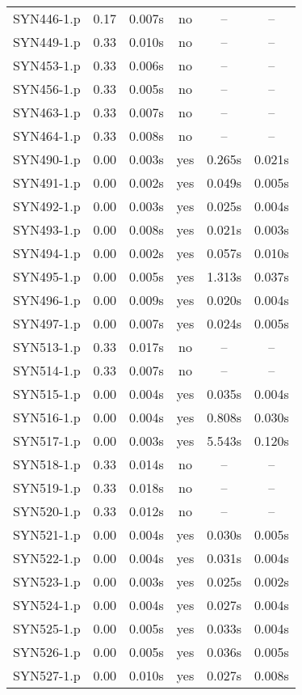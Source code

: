 \begin{center}
\begin{longtable}{||c | c | c | c | c | c||}
SYN446-1.p & 0.17 & 0.007s & no & -- & -- \\
SYN449-1.p & 0.33 & 0.010s & no & -- & -- \\
SYN453-1.p & 0.33 & 0.006s & no & -- & -- \\
SYN456-1.p & 0.33 & 0.005s & no & -- & -- \\
SYN463-1.p & 0.33 & 0.007s & no & -- & -- \\
SYN464-1.p & 0.33 & 0.008s & no & -- & -- \\
SYN490-1.p & 0.00 & 0.003s & yes & 0.265s & 0.021s \\
SYN491-1.p & 0.00 & 0.002s & yes & 0.049s & 0.005s \\
SYN492-1.p & 0.00 & 0.003s & yes & 0.025s & 0.004s \\
SYN493-1.p & 0.00 & 0.008s & yes & 0.021s & 0.003s \\
SYN494-1.p & 0.00 & 0.002s & yes & 0.057s & 0.010s \\
SYN495-1.p & 0.00 & 0.005s & yes & 1.313s & 0.037s \\
SYN496-1.p & 0.00 & 0.009s & yes & 0.020s & 0.004s \\
SYN497-1.p & 0.00 & 0.007s & yes & 0.024s & 0.005s \\
SYN513-1.p & 0.33 & 0.017s & no & -- & -- \\
SYN514-1.p & 0.33 & 0.007s & no & -- & -- \\
SYN515-1.p & 0.00 & 0.004s & yes & 0.035s & 0.004s \\
SYN516-1.p & 0.00 & 0.004s & yes & 0.808s & 0.030s \\
SYN517-1.p & 0.00 & 0.003s & yes & 5.543s & 0.120s \\
SYN518-1.p & 0.33 & 0.014s & no & -- & -- \\
SYN519-1.p & 0.33 & 0.018s & no & -- & -- \\
SYN520-1.p & 0.33 & 0.012s & no & -- & -- \\
SYN521-1.p & 0.00 & 0.004s & yes & 0.030s & 0.005s \\
SYN522-1.p & 0.00 & 0.004s & yes & 0.031s & 0.004s \\
SYN523-1.p & 0.00 & 0.003s & yes & 0.025s & 0.002s \\
SYN524-1.p & 0.00 & 0.004s & yes & 0.027s & 0.004s \\
SYN525-1.p & 0.00 & 0.005s & yes & 0.033s & 0.004s \\
SYN526-1.p & 0.00 & 0.005s & yes & 0.036s & 0.005s \\
SYN527-1.p & 0.00 & 0.010s & yes & 0.027s & 0.008s \\

\end{longtable}
\end{center}
